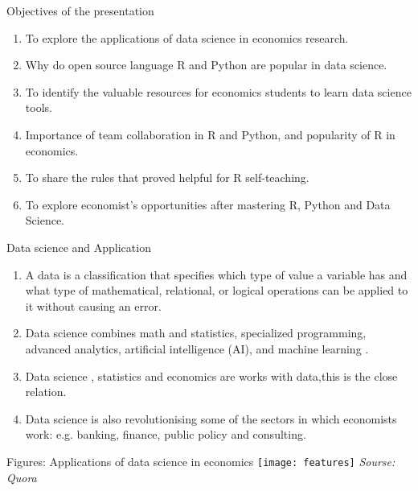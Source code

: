 \documentclass{beamer}
\begin{document}
	\begin{frame}[t]{Objectives of the presentation}
		
		\begin{enumerate}
			\item To explore the applications of data science in economics research.
			\item  Why do open source language R and Python are popular in data science.
			\item  To identify the valuable resources for economics students to learn data science tools. 
			\item Importance of team collaboration in R and Python, and popularity of R in economics.
			\item To share the rules that proved helpful for R self-teaching.
			\item To explore economist's opportunities after mastering R, Python and Data Science.
		\end{enumerate}
		
		
	\end{frame}
	\begin{frame}[t]{Data science and Application}
		
		
		\begin{enumerate}
			\item A data is a classification that specifies which type of value a variable has and what type of mathematical, relational, or logical operations can be applied to it without causing an error.
			\item  Data science combines math and statistics, specialized programming, advanced analytics, artificial intelligence (AI), and machine learning .
			\item  Data science , statistics and economics are works with data,this is the close relation.
			\item Data science is also  revolutionising  some of the sectors in which economists work: e.g. banking, finance, public policy and consulting.
			
		\end{enumerate}
		
	\end{frame}
	
	\begin{frame}{Figures: Applications of data science in economics}
		\texttt{[image: features]}
	\small	\emph{Sourse: Quora}
	\end{frame}
	
\end{document}
